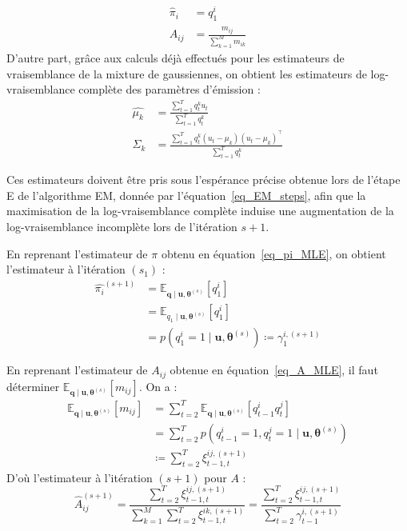 \documentclass[12pt,a4paper,onecolumn]{article}
\begin{document}
\begin{align}
	\widehat{\pi}_{i} & = q_1^i                              \label{eq_pi_MLE}  \\
	\widehat{A}_{ij}  & = \frac{m_{ij}}{\sum_{k = 1}^M m_{ik}} \label{eq_A_MLE}
\end{align}
D'autre part, grâce aux calculs déjà effectués pour les estimateurs de vraisemblance de la mixture de gaussiennes, on obtient les estimateurs de log-vraisemblance complète des paramètres d'émission :
\begin{align}
	\widehat{\mu_k}    & = \frac{\sum_{t = 1}^T q_{t}^k u_t}{\sum_{t = 1}^T q_{t}^k}                                                     \\
	\widehat{\Sigma_k} & = \frac{\sum_{t = 1}^T q_t^k\left(u_t - \mu_k\right)\left(u_t - \mu_k\right)^{\intercal}}{\sum_{t = 1}^T q_t^k}
\end{align}

Ces estimateurs doivent être pris sous l'espérance précise obtenue lors de l'étape E de l'algorithme EM, donnée par l'équation~\eqref{eq_EM_steps}, afin que la maximisation de la log-vraisemblance complète induise une augmentation de la log-vraisemblance incomplète lors de l'itération \(s + 1\).

En reprenant l'estimateur de \(\pi\) obtenu en équation~\eqref{eq_pi_MLE}, on obtient l'estimateur à l'itération \((s_1)\) :
\begin{equation}
	\begin{split}
		\widehat{\pi_{i}}^{(s + 1)} &= \mathbb{E}_{\bm{q} \mid \bm{u}, \bm{\theta}^{(s)}}[q_1^i] \\
		&= \mathbb{E}_{q_1 \mid \bm{u}, \bm{\theta}^{(s)}}[q_1^i] \\
		&= p(q_1^i = 1 \mid \bm{u}, \bm{\theta}^{(s)}) \coloneqq \gamma_1^{i, (s+1)}
	\end{split}
\end{equation}

En reprenant l'estimateur de \(A_{ij}\) obtenue en équation~\eqref{eq_A_MLE}, il faut déterminer \(\mathbb{E}_{\bm{q} \mid \bm{u}, \bm{\theta}^{(s)}}[m_{ij}]\). On a :
\begin{equation*}
	\begin{split}
		\mathbb{E}_{\bm{q} \mid \bm{u}, \bm{\theta}^{(s)}}[m_{ij}] &= \sum_{t=2}^T \mathbb{E}_{\bm{q} \mid \bm{u}, \bm{\theta}^{(s)}}\left[q_{t-1}^i q_t^j\right]\\
		&= \sum_{t=2}^T p\left(q_{t-1}^i = 1, q_t^j = 1 \mid \bm{u}, \bm{\theta}^{(s)}\right)\\
		&\coloneqq \sum_{t=2}^T \xi^{ij, (s+1)}_{t-1, t}
	\end{split}
\end{equation*}
D'où l'estimateur à l'itération \((s+1)\) pour \(A\) :
\begin{equation}
	\widehat{A}_{ij}^{(s+1)} = \frac{\sum_{t=2}^T \xi^{ij, (s+1)}_{t-1, t}}{\sum_{k = 1}^M\sum_{t=2}^T \xi^{ik, (s+1)}_{t-1, t}} = \frac{\sum_{t=2}^T \xi^{ij, (s+1)}_{t-1, t}}{\sum_{t=2}^T \gamma^{i, (s+1)}_{t-1}}
\end{equation}
\end{document}

